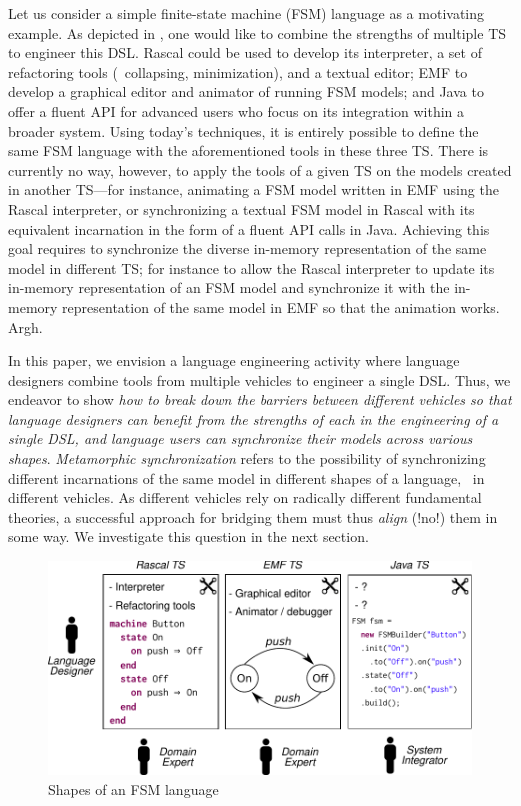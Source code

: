 \documentclass[sigplan]{acmart}
\begin{document}
Let us consider a simple finite-state machine (FSM) language as a motivating example.
As depicted in , one would like to combine the strengths of multiple TS to engineer this DSL.
Rascal could be used to develop its interpreter, a set of refactoring tools (\eg~collapsing, minimization), and a textual editor; EMF to develop a graphical editor and animator of running FSM models; and Java to offer a fluent API for advanced users who focus on its integration within a broader system.
Using today's techniques, it is entirely possible to define the same FSM language with the aforementioned tools in these three TS.
There is currently no way, however, to apply the tools of a given TS on the models created in another TS---for instance, animating a FSM model written in EMF using the Rascal interpreter, or synchronizing a textual FSM model in Rascal with its equivalent incarnation in the form of a fluent API calls in Java.
Achieving this goal requires to synchronize the diverse in-memory representation of the same model in different TS; for instance to allow the Rascal interpreter to update its in-memory representation of an FSM model and synchronize it with the in-memory representation of the same model in EMF so that the animation works. Argh.

In this paper, we envision a language engineering activity where language designers combine tools from multiple vehicles to engineer a single DSL.
Thus, we endeavor to show \emph{how to break down the barriers between different vehicles so that language designers can benefit from the strengths of each in the engineering of a single DSL, and language users can synchronize their models across various shapes}.
\emph{Metamorphic synchronization} refers to the possibility of synchronizing different incarnations of the same model in different shapes of a language, \ie~in different vehicles.
As different vehicles rely on radically different fundamental theories, a successful approach for bridging them must thus \emph{align} (!no!) them in some way.
We investigate this question in the next section.

\begin{figure}
	\centering
	\includegraphics[width=\columnwidth]{figures/motivating-fsm}
	\caption{Shapes of an FSM language}
	\label{fig:motivating-fsm}
\end{figure}
\end{document}
